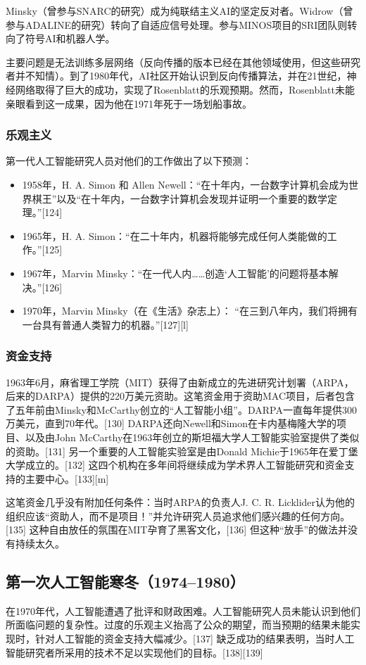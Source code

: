 Minsky（曾参与SNARC的研究）成为纯联结主义AI的坚定反对者。Widrow（曾参与ADALINE的研究）转向了自适应信号处理。参与MINOS项目的SRI团队则转向了符号AI和机器人学。

主要问题是无法训练多层网络（反向传播的版本已经在其他领域使用，但这些研究者并不知情）。到了1980年代，AI社区开始认识到反向传播算法，并在21世纪，神经网络取得了巨大的成功，实现了Rosenblatt的乐观预期。然而，Rosenblatt未能亲眼看到这一成果，因为他在1971年死于一场划船事故。
\subsubsection{乐观主义}
第一代人工智能研究人员对他们的工作做出了以下预测：
\begin{itemize}
\item 1958年，H. A. Simon 和 Allen Newell：“在十年内，一台数字计算机会成为世界棋王”以及“在十年内，一台数字计算机会发现并证明一个重要的数学定理。”[124]
\item 1965年，H. A. Simon：“在二十年内，机器将能够完成任何人类能做的工作。”[125]
\item 1967年，Marvin Minsky：“在一代人内……创造‘人工智能’的问题将基本解决。”[126]
\item 1970年，Marvin Minsky（在《生活》杂志上）： “在三到八年内，我们将拥有一台具有普通人类智力的机器。”[127][l]
\end{itemize}
\subsubsection{资金支持}
1963年6月，麻省理工学院（MIT）获得了由新成立的先进研究计划署（ARPA，后来的DARPA）提供的220万美元资助。这笔资金用于资助MAC项目，后者包含了五年前由Minsky和McCarthy创立的“人工智能小组”。DARPA一直每年提供300万美元，直到70年代。[130] DARPA还向Newell和Simon在卡内基梅隆大学的项目、以及由John McCarthy在1963年创立的斯坦福大学人工智能实验室提供了类似的资助。[131] 另一个重要的人工智能实验室是由Donald Michie于1965年在爱丁堡大学成立的。[132] 这四个机构在多年间将继续成为学术界人工智能研究和资金支持的主要中心。[133][m]

这笔资金几乎没有附加任何条件：当时ARPA的负责人J. C. R. Licklider认为他的组织应该“资助人，而不是项目！”并允许研究人员追求他们感兴趣的任何方向。[135] 这种自由放任的氛围在MIT孕育了黑客文化，[136] 但这种“放手”的做法并没有持续太久。
\subsection{第一次人工智能寒冬（1974–1980）}
在1970年代，人工智能遭遇了批评和财政困难。人工智能研究人员未能认识到他们所面临问题的复杂性。过度的乐观主义抬高了公众的期望，而当预期的结果未能实现时，针对人工智能的资金支持大幅减少。[137] 缺乏成功的结果表明，当时人工智能研究者所采用的技术不足以实现他们的目标。[138][139]

